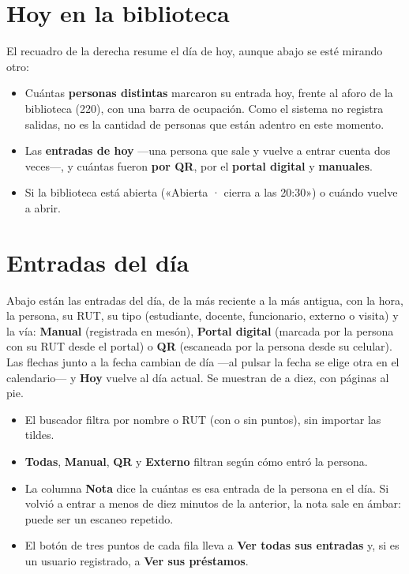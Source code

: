 \documentclass[11pt,a4paper]{report}
\begin{document}
\section{Hoy en la biblioteca}

El recuadro de la derecha resume el día de hoy, aunque abajo se esté
mirando otro:

\begin{itemize}
  \item Cuántas \textbf{personas distintas} marcaron su entrada hoy, frente
  al aforo de la biblioteca (220), con una barra de ocupación. Como el
  sistema no registra salidas, no es la cantidad de personas que están
  adentro en este momento.
  \item Las \textbf{entradas de hoy} ---una persona que sale y vuelve a
  entrar cuenta dos veces---, y cuántas fueron \textbf{por QR}, por el
  \textbf{portal digital} y \textbf{manuales}.
  \item Si la biblioteca está abierta («Abierta · cierra a las 20:30») o
  cuándo vuelve a abrir.
\end{itemize}

\section{Entradas del día}

Abajo están las entradas del día, de la más reciente a la más antigua, con
la hora, la persona, su RUT, su tipo (estudiante, docente, funcionario,
externo o visita) y la vía: \textbf{Manual} (registrada en mesón),
\textbf{Portal digital} (marcada por la persona con su RUT desde el
portal) o \textbf{QR} (escaneada por la persona desde su celular). Las flechas junto a
la fecha cambian de día ---al pulsar la fecha se elige otra en el
calendario--- y \textbf{Hoy} vuelve al día actual. Se muestran de a diez,
con páginas al pie.

\begin{itemize}
  \item El buscador filtra por nombre o RUT (con o sin puntos), sin
  importar las tildes.
  \item \textbf{Todas}, \textbf{Manual}, \textbf{QR} y \textbf{Externo}
  filtran según cómo entró la persona.
  \item La columna \textbf{Nota} dice la cuántas es esa entrada de la
  persona en el día. Si volvió a entrar a menos de diez minutos de la
  anterior, la nota sale en ámbar: puede ser un escaneo repetido.
  \item El botón de tres puntos de cada fila lleva a \textbf{Ver todas sus
  entradas} y, si es un usuario registrado, a \textbf{Ver sus préstamos}.
\end{itemize}
\end{document}
